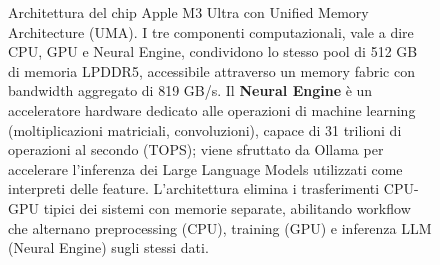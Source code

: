 \begin{figure}[htbp]
    \caption{Architettura del chip Apple M3 Ultra con Unified Memory Architecture (UMA). I tre componenti computazionali, vale a dire CPU, GPU e Neural Engine, condividono lo stesso pool di 512 GB di memoria LPDDR5, accessibile attraverso un memory fabric con bandwidth aggregato di 819 GB/s. Il \textbf{Neural Engine} è un acceleratore hardware dedicato alle operazioni di machine learning (moltiplicazioni matriciali, convoluzioni), capace di 31 trilioni di operazioni al secondo (TOPS); viene sfruttato da Ollama per accelerare l'inferenza dei Large Language Models utilizzati come interpreti delle feature. L'architettura elimina i trasferimenti CPU-GPU tipici dei sistemi con memorie separate, abilitando workflow che alternano preprocessing (CPU), training (GPU) e inferenza LLM (Neural Engine) sugli stessi dati.}
    \label{fig:m3_ultra_architecture}
\end{figure}

